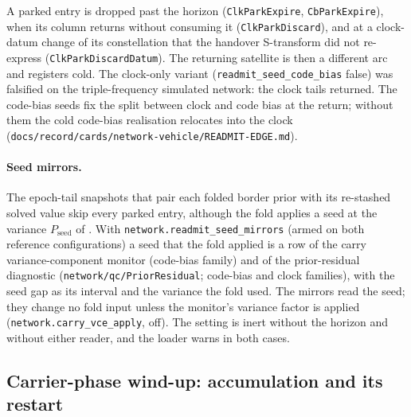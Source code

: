 \documentclass[main.tex]{subfiles}
\begin{document}
A parked entry is dropped past the horizon (\texttt{ClkParkExpire},
\texttt{CbParkExpire}), when its column returns without consuming it
(\texttt{ClkParkDiscard}), and at a clock-datum change of its
constellation that the handover S-transform did not re-express
(\texttt{ClkParkDiscardDatum}). The returning satellite is then a
different arc and registers cold. The clock-only variant
(\texttt{readmit\_seed\_code\_bias} false) was falsified on the
triple-frequency simulated network: the clock tails returned. The
code-bias seeds fix the split between clock and code bias at the return;
without them the cold code-bias realisation relocates into the clock
(\texttt{docs/record/cards/network-vehicle/READMIT-EDGE.md}).

\paragraph{Seed mirrors.}
The epoch-tail snapshots that pair each folded border prior with its
re-stashed solved value skip every parked entry, although the fold applies a
seed at the variance $P_{\mathrm{seed}}$ of . With
\texttt{network.readmit\_seed\_mirrors} (armed on both reference
configurations) a seed that the fold applied is a row of the carry
variance-component monitor (code-bias family) and of the prior-residual
diagnostic (\texttt{network/qc/PriorResidual}; code-bias and clock
families), with the seed gap as its interval
and the variance the fold used. The mirrors read the seed; they change
no fold input unless the monitor's variance factor is applied
(\texttt{network.carry\_vce\_apply}, off). The setting is inert without the
horizon and without either reader, and the loader warns in both cases.

\subsection{Carrier-phase wind-up: accumulation and its restart}\label{sec:net-wire-windup}
\end{document}
